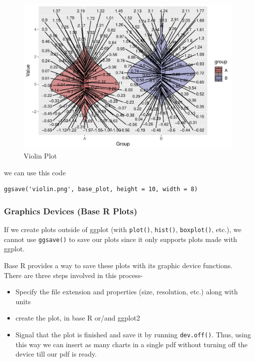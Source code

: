 \documentclass[
]{book}
\providecommand{\tightlist}{%
  \setlength{\itemsep}{0pt}\setlength{\parskip}{0pt}}
\begin{document}
\begin{figure}

{\centering \includegraphics[width=0.95\linewidth]{DauR_files/figure-latex/export2-1} 

}

\caption{Violin Plot}\label{fig:export2}
\end{figure}

we can use this code

\begin{verbatim}
ggsave('violin.png', base_plot, height = 10, width = 8)
\end{verbatim}

\hypertarget{graphics-devices-base-r-plots}{%
\subsubsection*{Graphics Devices (Base R Plots)}\label{graphics-devices-base-r-plots}}

If we create plots outside of ggplot (with \texttt{plot()}, \texttt{hist()}, \texttt{boxplot()}, etc.), we cannot use \texttt{ggsave()} to save our plots since it only supports plots made with ggplot.

Base R provides a way to save these plots with its graphic device functions. There are three steps involved in this process-

\begin{itemize}
\tightlist
\item
  Specify the file extension and properties (size, resolution, etc.) along with units
\item
  create the plot, in base R or/and ggplot2
\item
  Signal that the plot is finished and save it by running \texttt{dev.off()}. Thus, using this way we can insert as many charts in a single pdf without turning off the device till our pdf is ready.
\end{itemize}
\end{document}
